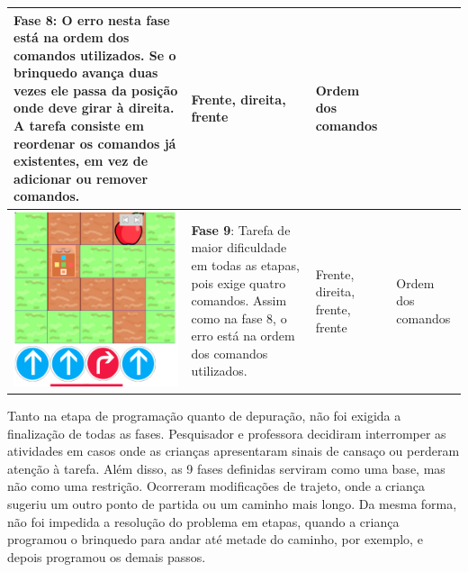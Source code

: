 \begin{quadro}[htbp]
\begin{longtable}{ | m{} | m{} | m{} | m{} |}
         \textbf{Fase 8}:
         O erro nesta fase está na ordem dos comandos utilizados. Se o brinquedo avança duas vezes ele passa da posição onde deve girar à direita. A tarefa consiste em reordenar os comandos já existentes, em vez de adicionar ou remover comandos. &
 
         Frente, direita, frente & Ordem dos comandos
         
         \\ \hline
     
     
         \includegraphics[width=.9\linewidth]{figs/debug/4.png} &
     
         \textbf{Fase 9}: 
         Tarefa de maior dificuldade em todas as etapas, pois exige quatro comandos. Assim como na fase 8, o erro está na ordem dos comandos utilizados.
         &
         Frente, direita, frente, frente & Ordem dos comandos
         
         \\ \hline
     

    \end{longtable}
\end{quadro}

Tanto na etapa de programação quanto de depuração, não foi exigida a finalização de todas as fases. Pesquisador e professora decidiram interromper as atividades em casos onde as crianças apresentaram sinais de cansaço ou perderam atenção à tarefa. Além disso, as 9 fases definidas serviram como uma base, mas não como uma restrição. Ocorreram modificações de trajeto, onde a criança sugeriu um outro ponto de partida ou um caminho mais longo. Da mesma forma, não foi impedida a resolução do problema em etapas, quando a criança programou o brinquedo para andar até metade do caminho, por exemplo, e depois programou os demais passos.

